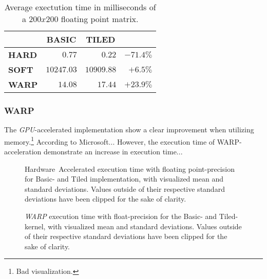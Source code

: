 \documentclass[fleqn,10pt]{SelfArx} %
\begin{document}
\begin{table}[h]
\begin{center}
\begin{tabular}{r|r|r|r|}
	\cline{2-3}
							& \multicolumn{1}{|c|}{\textbf{BASIC}} & \multicolumn{1}{|c|}{\textbf{TILED}}		\\ \hline
	\multicolumn{1}{|l|}{\textbf{HARD}}	& $0.77$			& $0.22$		& $-71.4\%$    				\\ \hline
	\multicolumn{1}{|l|}{\textbf{SOFT}}	& $10247.03$		& $10909.88$	& $+6.5\%$     				\\ \hline
	\multicolumn{1}{|l|}{\textbf{WARP}}	& $14.08$			& $17.44$		& $+23.9\%$    				\\ \hline
\end{tabular}
\label{tab:contribution:results:summaryfloat}
\caption{Average exectution time in milliseconds of a $200x200$ floating point matrix.}
\end{center}
\end{table}


\subsubsection{WARP}
\label{sec:contribution:results:warp}
The \textit{GPU}-accelerated implementation show a clear improvement when utilizing memory.\footnote{Bad visualization.} According to Microsoft... However, the execution time of WARP-acceleration demonstrate an increase in execution time...
\begin{figure}[htb]
\begin{center}
	\resizebox{ \columnwidth }{!}{}
	\caption{Hardware~Accelerated execution time with floating point-precision for Basic- and Tiled implementation, with visualized mean and standard deviations. Values outside of their respective standard deviations have been clipped for the sake of clarity.}
	\label{fig:contribution:results:warp:msshard}
\end{center}
\end{figure}

\begin{figure}[htb]
\begin{center}
	\resizebox{ \columnwidth }{!}{}
	\caption{\textit{WARP} execution time with float-precision for the Basic- and Tiled-kernel, with visualized mean and standard deviations. Values outside of their respective standard deviations have been clipped for the sake of clarity.}
	\label{fig:contribution:results:warp:msswarp}
\end{center}
\end{figure}
\end{document}
